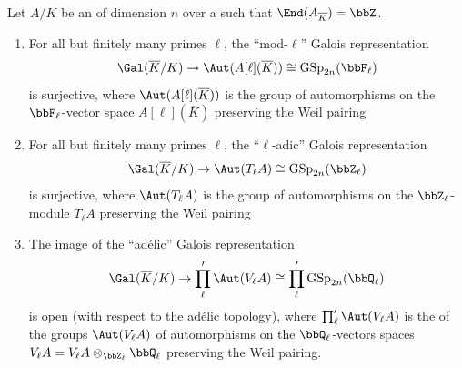 \begin{theorem} \label{theorem:serres_generalized_open_image_theorem_for_abelian_varieties_over_number_fields_without_geometric_complex_multiplication}
    Let $A/K$ be an  of dimension $n$ over a  such that $\End(A_{\overline{K}}) = \bbZ$. 
    \begin{enumerate}
        \item For all but finitely many primes $\ell$, the ``mod-$\ell$'' Galois representation
        $$\Gal(\overline{K} / K) \to \Aut(A[\ell](\overline{K})) \cong \mathrm{GSp}_{2n}(\bbF_\ell)$$
        is surjective, where $\Aut(A[\ell](\overline{K}))$ is the group of automorphisms on the $\bbF_\ell$-vector space $A[\ell](\overline{K})$ preserving the Weil pairing 

        \item For all but finitely many primes $\ell$, the ``$\ell$-adic'' Galois representation
        $$\Gal(\overline{K} / K) \to \Aut(T_\ell A) \cong \mathrm{GSp}_{2n}(\bbZ_\ell)$$
        is surjective, where $\Aut(T_\ell A)$ is the group of automorphisms on the $\bbZ_\ell$-module $T_\ell A$ preserving the Weil pairing 

        \item The image of the ``ad\'elic'' Galois representation
        $$\Gal(\overline{K} / K) \to \prod_{\ell}' \Aut(V_\ell A) \cong \prod_{\ell}' \mathrm{GSp}_{2n}(\bbQ_\ell)$$
        is open (with respect to the ad\'elic topology), where $\prod_{\ell}' \Aut(V_\ell A)$ is the  of the groups $\Aut(V_\ell A)$ of automorphisms on the $\bbQ_\ell$-vectors spaces $V_\ell A = V_\ell A \otimes_{\bbZ_\ell} \bbQ_\ell$ preserving the Weil pairing.
    \end{enumerate}
\end{theorem}